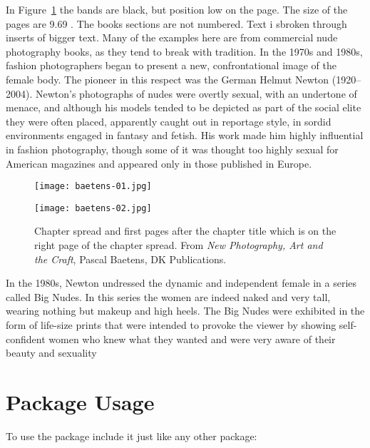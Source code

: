 \clearpage



In Figure~\ref{fig:photospread} the bands are black, but position low on the page. The size of the pages are 9.69 . The books sections are not numbered. Text i sbroken through inserts of bigger text. Many of the examples here are from
commercial nude photography books, as they tend to break with tradition. In the 1970s and 1980s, fashion photographers began to present a
new, confrontational image of the female body. The pioneer in this
respect was the German Helmut Newton (1920–2004). Newton’s
photographs of nudes were overtly sexual, with an undertone of
menace, and although his models tended to be depicted as part
of the social elite they were often placed, apparently caught out
in reportage style, in sordid environments engaged in fantasy and
fetish. His work made him highly influential in fashion photography,
though some of it was thought too highly sexual for American
magazines and appeared only in those published in Europe.


\begin{figure}[htbp]
\parindent=0pt
\texttt{[image: baetens-01.jpg]} \par
\vfill\vfill\vfill\vfill
\texttt{[image: baetens-02.jpg]}\par
\caption{Chapter spread and first pages after the chapter title which is on the right page of the chapter spread. From \textit{New Photography, Art and the Craft}, Pascal Baetens, DK Publications. }
\label{fig:photospread}
\end{figure}

In the 1980s, Newton undressed the dynamic and independent
female in a series called Big Nudes. In this series the women are
indeed naked and very tall, wearing nothing but makeup and high
heels. The Big Nudes were exhibited in the form of life-size prints
that were intended to provoke the viewer by showing self-confident
women who knew what they wanted and were very aware of their
beauty and sexuality



\chapter{Package Usage}

To use the package include it just like any other package:


